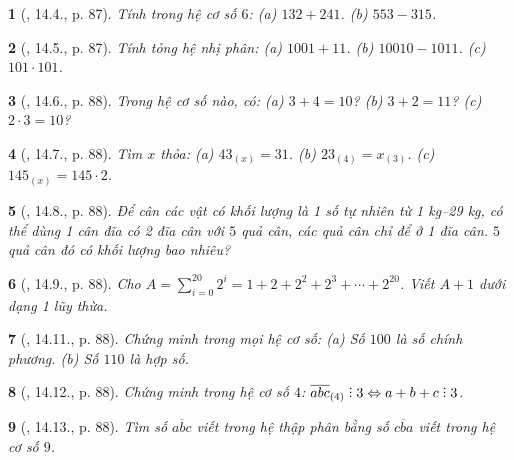 \documentclass{article}
\newtheorem{baitoan}{}
\DeclareRobustCommand{\divby}{%
	\mathrel{\vbox{\baselineskip.65ex\lineskiplimit0pt\hbox{.}\hbox{.}\hbox{.}}}%
}
\begin{document}
\begin{baitoan}[\cite{TLCT_THCS_Toan_6_so_hoc}, 14.4., p. 87]
	Tính trong hệ cơ số $6$: (a) $132 + 241$. (b) $553 - 315$.
\end{baitoan}

\begin{baitoan}[\cite{TLCT_THCS_Toan_6_so_hoc}, 14.5., p. 87]
	Tính tỏng hệ nhị phân: (a) $1001 + 11$. (b) $10010 - 1011$. (c) $101\cdot101$.
\end{baitoan}

\begin{baitoan}[\cite{TLCT_THCS_Toan_6_so_hoc}, 14.6., p. 88]
	Trong hệ cơ số nào, có: (a) $3 + 4 = 10$? (b) $3 + 2 = 11$? (c) $2\cdot3 = 10$?
\end{baitoan}

\begin{baitoan}[\cite{TLCT_THCS_Toan_6_so_hoc}, 14.7., p. 88]
	Tìm $x$ thỏa: (a) $43_{(x)} = 31$. (b) $23_(4) = x_{(3)}$. (c) $145_{(x)} = 145\cdot2$.
\end{baitoan}

\begin{baitoan}[\cite{TLCT_THCS_Toan_6_so_hoc}, 14.8., p. 88]
	Để cân các vật có khối lượng là 1 số tự nhiên từ {\rm1 kg--29 kg}, có thể dùng 1 cân đĩa có 2 đĩa cân với $5$ quả cân, các quả cân chỉ để ở 1 đĩa cân. $5$ quả cân đó có khối lượng bao nhiêu?
\end{baitoan}

\begin{baitoan}[\cite{TLCT_THCS_Toan_6_so_hoc}, 14.9., p. 88]
	Cho $A = \sum_{i=0}^{20} 2^i = 1 + 2 + 2^2 + 2^3 + \cdots + 2^{20}$. Viết $A + 1$ dưới dạng 1 lũy thừa.
\end{baitoan}

\begin{baitoan}[\cite{TLCT_THCS_Toan_6_so_hoc}, 14.11., p. 88]
	Chứng minh trong mọi hệ cơ số: (a) Số $100$ là số chính phương. (b) Số $110$ là hợp số.
\end{baitoan}

\begin{baitoan}[\cite{TLCT_THCS_Toan_6_so_hoc}, 14.12., p. 88]
	Chứng minh trong hệ cơ số $4$: $\overline{abc}_{(4)}\divby3\Leftrightarrow a + b + c\divby3$.
\end{baitoan}

\begin{baitoan}[\cite{TLCT_THCS_Toan_6_so_hoc}, 14.13., p. 88]
	Tìm số $\overline{abc}$ viết trong hệ thập phân bằng số $\overline{cba}$ viết trong hệ cơ số $9$.
\end{baitoan}
\end{document}
